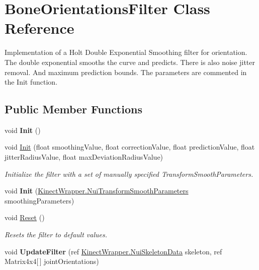 \hypertarget{class_bone_orientations_filter}{}\section{Bone\+Orientations\+Filter Class Reference}
\label{class_bone_orientations_filter}


Implementation of a Holt Double Exponential Smoothing filter for orientation. The double exponential smooths the curve and predicts. There is also noise jitter removal. And maximum prediction bounds. The parameters are commented in the Init function.  


\subsection*{Public Member Functions}
\begin{DoxyCompactItemize}
\item 
\mbox{\label{class_bone_orientations_filter_a3be769b3d49e677fa475b6d7d3de5f52}} 
void {\bfseries Init} ()
\item 
void \mbox{\hyperlink{class_bone_orientations_filter_a0cfdcfa52dc01bac029c04084dca64f2}{Init}} (float smoothing\+Value, float correction\+Value, float prediction\+Value, float jitter\+Radius\+Value, float max\+Deviation\+Radius\+Value)
\begin{DoxyCompactList}\small\item\em Initialize the filter with a set of manually specified Transform\+Smooth\+Parameters. \end{DoxyCompactList}\item 
\mbox{\label{class_bone_orientations_filter_ae7531e45a6afef3e56cfe6a857cfccf4}} 
void {\bfseries Init} (\mbox{\hyperlink{struct_kinect_wrapper_1_1_nui_transform_smooth_parameters}{Kinect\+Wrapper.\+Nui\+Transform\+Smooth\+Parameters}} smoothing\+Parameters)
\item 
\mbox{\label{class_bone_orientations_filter_a7460b686bf3641385a9e09725ae146df}} 
void \mbox{\hyperlink{class_bone_orientations_filter_a7460b686bf3641385a9e09725ae146df}{Reset}} ()
\begin{DoxyCompactList}\small\item\em Resets the filter to default values. \end{DoxyCompactList}\item 
\mbox{\label{class_bone_orientations_filter_a0f170cd9ad67f29a62688afa09916560}} 
void {\bfseries Update\+Filter} (ref \mbox{\hyperlink{struct_kinect_wrapper_1_1_nui_skeleton_data}{Kinect\+Wrapper.\+Nui\+Skeleton\+Data}} skeleton, ref Matrix4x4\mbox{[}$\,$\mbox{]} joint\+Orientations)
\end{DoxyCompactItemize}
